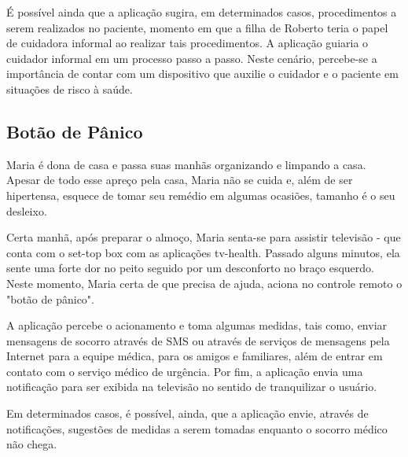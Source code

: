 É possível ainda que a aplicação sugira, em determinados casos, procedimentos a
serem realizados no paciente, momento em que a filha de Roberto teria o papel de
cuidadora informal ao realizar tais procedimentos. A aplicação guiaria o
cuidador informal em um processo passo a passo. Neste cenário,  percebe-se a
importância de contar com um dispositivo que auxilie o cuidador e o paciente em
situações de risco à saúde.

\subsection{Botão de Pânico}\label{subsec:botao-panico}

Maria é dona de casa e passa suas manhãs organizando e limpando a casa. Apesar
de todo esse apreço pela casa, Maria não se cuida e, além de ser hipertensa,
esquece de tomar seu remédio em algumas ocasiões, tamanho é o seu desleixo.

Certa manhã, após preparar o almoço, Maria senta-se para assistir televisão -
que conta com o set-top box com as aplicações tv-health. Passado
alguns minutos, ela sente uma forte dor no peito seguido por um desconforto no
braço esquerdo. Neste momento, Maria certa de que precisa de ajuda, aciona no
controle remoto o "botão de pânico".

A aplicação percebe o acionamento e toma algumas medidas, tais como, enviar
mensagens de socorro através de SMS ou através de serviços de mensagens pela
Internet para a equipe médica, para os amigos e familiares, além de entrar em
contato com o serviço médico de urgência. Por fim, a aplicação envia uma
notificação para ser exibida na televisão no sentido de tranquilizar o usuário.

Em determinados casos, é possível, ainda, que a aplicação envie, através de
notificações, sugestões de medidas a serem tomadas enquanto o socorro médico não
chega.
